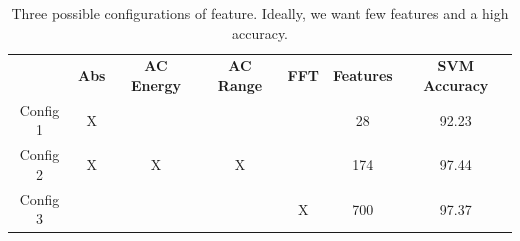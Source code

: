 




\begin{table}
\begin{center}
  \begin{tabular}{|c|cccccc|}
\hline
    \rowcolor{gray!150}
		  & \color{white}\textbf{Abs} & \color{white}\textbf{AC Energy} & \color{white}\textbf{AC Range} & \color{white}\textbf{FFT} & \color{white}\textbf{Features} & \color{white}\textbf{SVM Accuracy} \\
	  Config 1 & X &   &   &   & 28  & 92.23 \\
	  Config 2 & X & X & X & & 174 & 97.44 \\
	  Config 3 & & & & X & 700 & 97.37 \\
\hline
  \end{tabular}
\end{center}
\caption{Three possible configurations of feature. Ideally, we want few features and a high accuracy.}
\label{tab:feat}
\end{table}


